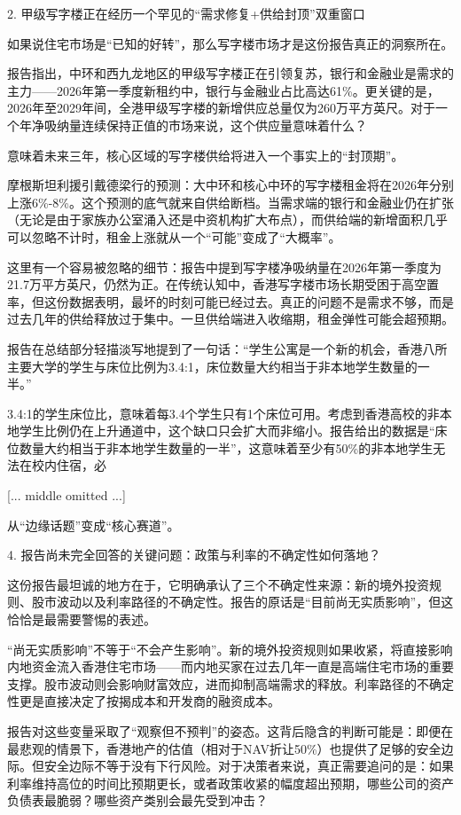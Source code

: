 \documentclass[11pt]{ctexart}
\begin{document}
2. 甲级写字楼正在经历一个罕见的“需求修复+供给封顶”双重窗口

如果说住宅市场是“已知的好转”，那么写字楼市场才是这份报告真正的洞察所在。

报告指出，中环和西九龙地区的甲级写字楼正在引领复苏，银行和金融业是需求的主力——2026年第一季度新租约中，银行与金融业占比高达61\%。更关键的是，2026年至2029年间，全港甲级写字楼的新增供应总量仅为260万平方英尺。对于一个年净吸纳量连续保持正值的市场来说，这个供应量意味着什么？

意味着未来三年，核心区域的写字楼供给将进入一个事实上的“封顶期”。

摩根斯坦利援引戴德梁行的预测：大中环和核心中环的写字楼租金将在2026年分别上涨6\%-8\%。这个预测的底气就来自供给断档。当需求端的银行和金融业仍在扩张（无论是由于家族办公室涌入还是中资机构扩大布点），而供给端的新增面积几乎可以忽略不计时，租金上涨就从一个“可能”变成了“大概率”。

这里有一个容易被忽略的细节：报告中提到写字楼净吸纳量在2026年第一季度为21.7万平方英尺，仍然为正。在传统认知中，香港写字楼市场长期受困于高空置率，但这份数据表明，最坏的时刻可能已经过去。真正的问题不是需求不够，而是过去几年的供给释放过于集中。一旦供给端进入收缩期，租金弹性可能会超预期。

报告在总结部分轻描淡写地提到了一句话：“学生公寓是一个新的机会，香港八所主要大学的学生与床位比例为3.4:1，床位数量大约相当于非本地学生数量的一半。”

3.4:1的学生床位比，意味着每3.4个学生只有1个床位可用。考虑到香港高校的非本地学生比例仍在上升通道中，这个缺口只会扩大而非缩小。报告给出的数据是“床位数量大约相当于非本地学生数量的一半”，这意味着至少有50\%的非本地学生无法在校内住宿，必

[... middle omitted ...]

从“边缘话题”变成“核心赛道”。

4. 报告尚未完全回答的关键问题：政策与利率的不确定性如何落地？

这份报告最坦诚的地方在于，它明确承认了三个不确定性来源：新的境外投资规则、股市波动以及利率路径的不确定性。报告的原话是“目前尚无实质影响”，但这恰恰是最需要警惕的表述。

“尚无实质影响”不等于“不会产生影响”。新的境外投资规则如果收紧，将直接影响内地资金流入香港住宅市场——而内地买家在过去几年一直是高端住宅市场的重要支撑。股市波动则会影响财富效应，进而抑制高端需求的释放。利率路径的不确定性更是直接决定了按揭成本和开发商的融资成本。

报告对这些变量采取了“观察但不预判”的姿态。这背后隐含的判断可能是：即便在最悲观的情景下，香港地产的估值（相对于NAV折让50\%）也提供了足够的安全边际。但安全边际不等于没有下行风险。对于决策者来说，真正需要追问的是：如果利率维持高位的时间比预期更长，或者政策收紧的幅度超出预期，哪些公司的资产负债表最脆弱？哪些资产类别会最先受到冲击？
\end{document}

